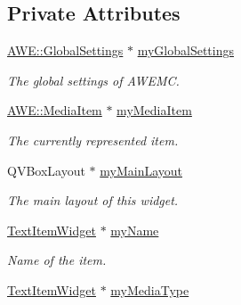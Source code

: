 \subsection*{Private Attributes}
\begin{DoxyCompactItemize}
\item 
\hypertarget{class_u_i_1_1_info_pane_a01d33d71d1eb06f126888f9c53ceeaf9}{\hyperlink{class_a_w_e_1_1_global_settings}{A\-W\-E\-::\-Global\-Settings} $\ast$ \hyperlink{class_u_i_1_1_info_pane_a01d33d71d1eb06f126888f9c53ceeaf9}{my\-Global\-Settings}}\label{class_u_i_1_1_info_pane_a01d33d71d1eb06f126888f9c53ceeaf9}

\begin{DoxyCompactList}\small\item\em The global settings of A\-W\-E\-M\-C. \end{DoxyCompactList}\item 
\hypertarget{class_u_i_1_1_info_pane_a352dd5525408219f86e120c10f1388b8}{\hyperlink{class_a_w_e_1_1_media_item}{A\-W\-E\-::\-Media\-Item} $\ast$ \hyperlink{class_u_i_1_1_info_pane_a352dd5525408219f86e120c10f1388b8}{my\-Media\-Item}}\label{class_u_i_1_1_info_pane_a352dd5525408219f86e120c10f1388b8}

\begin{DoxyCompactList}\small\item\em The currently represented item. \end{DoxyCompactList}\item 
\hypertarget{class_u_i_1_1_info_pane_a2090f674aa684ddeec38af69a4eae4c2}{Q\-V\-Box\-Layout $\ast$ \hyperlink{class_u_i_1_1_info_pane_a2090f674aa684ddeec38af69a4eae4c2}{my\-Main\-Layout}}\label{class_u_i_1_1_info_pane_a2090f674aa684ddeec38af69a4eae4c2}

\begin{DoxyCompactList}\small\item\em The main layout of this widget. \end{DoxyCompactList}\item 
\hypertarget{class_u_i_1_1_info_pane_ac056bd28df63fabb24e67409d958566a}{\hyperlink{class_u_i_1_1_text_item_widget}{Text\-Item\-Widget} $\ast$ \hyperlink{class_u_i_1_1_info_pane_ac056bd28df63fabb24e67409d958566a}{my\-Name}}\label{class_u_i_1_1_info_pane_ac056bd28df63fabb24e67409d958566a}

\begin{DoxyCompactList}\small\item\em Name of the item. \end{DoxyCompactList}\item 
\hypertarget{class_u_i_1_1_info_pane_afc334fdded52a648a284284b1f0a6cf4}{\hyperlink{class_u_i_1_1_text_item_widget}{Text\-Item\-Widget} $\ast$ \hyperlink{class_u_i_1_1_info_pane_afc334fdded52a648a284284b1f0a6cf4}{my\-Media\-Type}}\label{class_u_i_1_1_info_pane_afc334fdded52a648a284284b1f0a6cf4}


\end{DoxyCompactItemize}

